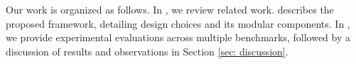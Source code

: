     

    

Our work is organized as follows. In , we review related work.  describes the proposed framework, detailing design choices and its modular components. In , we provide experimental evaluations across multiple benchmarks, followed by a discussion of results and observations in Section \ref{sec: discussion}. 

